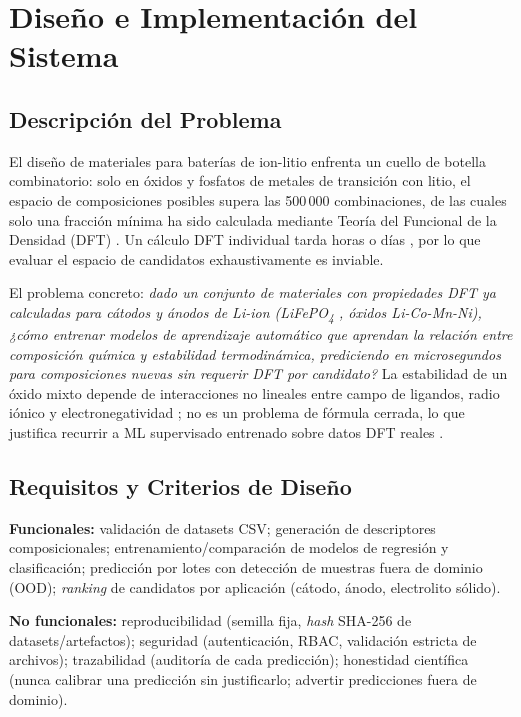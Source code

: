 \chapter{Diseño e Implementación del Sistema}

\section{Descripción del Problema}

El diseño de materiales para baterías de ion-litio enfrenta un cuello de
botella combinatorio: solo en óxidos y fosfatos de metales de transición con
litio, el espacio de composiciones posibles supera las 500\,000 combinaciones,
de las cuales solo una fracción mínima ha sido calculada mediante Teoría del
Funcional de la Densidad (DFT) \citep{urban2016computational}. Un cálculo DFT
individual tarda horas o días \citep{jain2013materialsproject}, por lo que
evaluar el espacio de candidatos exhaustivamente es inviable.

El problema concreto: \emph{dado un conjunto de materiales con propiedades
DFT ya calculadas para cátodos y ánodos de Li-ion (LiFePO\textsubscript{4}
\citep{padhi1997phospho}, óxidos Li-Co-Mn-Ni), ¿cómo entrenar modelos de
aprendizaje automático que aprendan la relación entre composición química y
estabilidad termodinámica, prediciendo en microsegundos para composiciones
nuevas sin requerir DFT por candidato?} La estabilidad de un óxido mixto
depende de interacciones no lineales entre campo de ligandos, radio iónico y
electronegatividad \citep{behler2007generalized}; no es un problema de
fórmula cerrada, lo que justifica recurrir a ML supervisado entrenado sobre
datos DFT reales \citep{ward2016general, meredig2014combinatorial}.

\section{Requisitos y Criterios de Diseño}

\textbf{Funcionales:} validación de datasets CSV; generación de descriptores
composicionales; entrenamiento/comparación de modelos de regresión y
clasificación; predicción por lotes con detección de muestras fuera de
dominio (OOD); \textit{ranking} de candidatos por aplicación (cátodo, ánodo,
electrolito sólido).

\textbf{No funcionales:} reproducibilidad (semilla fija, \textit{hash}
SHA-256 de datasets/artefactos); seguridad (autenticación, RBAC, validación
estricta de archivos); trazabilidad (auditoría de cada predicción); honestidad
científica (nunca calibrar una predicción sin justificarlo; advertir
predicciones fuera de dominio).

